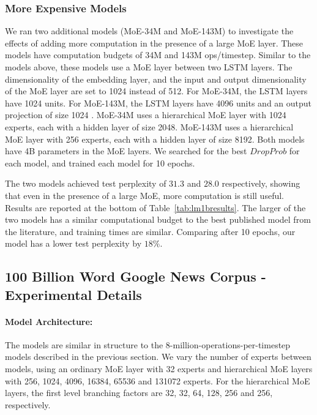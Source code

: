 \documentclass{article}
\begin{document}
\subsubsection{More Expensive Models}\label{sec:expensive}

We ran two additional models (MoE-34M and MoE-143M) to investigate the effects of adding more computation in the presence of a large MoE layer.  These models have computation budgets of 34M and 143M ops/timestep.   Similar to the models above, these models use a MoE layer between two LSTM layers.  The dimensionality of the embedding layer, and the input and output dimensionality of the MoE layer are set to 1024 instead of 512.  For MoE-34M, the LSTM layers have 1024 units.  For MoE-143M, the LSTM layers have 4096 units and an output projection of size 1024  \citep{sak2014long}.  MoE-34M uses a hierarchical MoE layer with 1024 experts, each with a hidden layer of size 2048.   MoE-143M uses a hierarchical MoE layer with 256 experts, each with a hidden layer of size 8192.  Both models have 4B parameters in the MoE layers.  We searched for the best $DropProb$ for each model, and trained each model for 10 epochs.

The two models achieved test perplexity of $31.3$ and $28.0$ respectively, showing that even in the presence of a large MoE, more computation is still useful.  Results are reported at the bottom of Table~\ref{tab:lm1bresults}.   The larger of the two models has a similar computational budget to the best published model from the literature, and training times are similar.  Comparing after 10 epochs, our model has a lower test perplexity by $18\%$. 

\subsection{100 Billion Word Google News Corpus - Experimental Details}\label{sec:appendixgn11}

\paragraph{Model Architecture:}  The models are similar in structure to the 8-million-operations-per-timestep models described in the previous section.   We vary the number of experts between models, using an ordinary MoE layer with 32 experts and hierarchical MoE layers with 256, 1024, 4096, 16384, 65536 and 131072 experts.   For the hierarchical MoE layers, the first level branching factors are 32, 32, 64, 128, 256 and 256, respectively.
\end{document}
